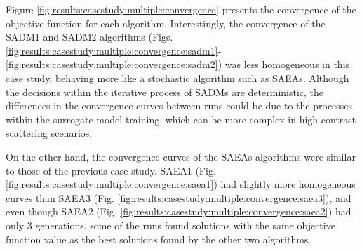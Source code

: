 			
			Figure \ref{fig:results:casestudy:multiple:convergence} presents the convergence of the objective function for each algorithm. Interestingly, the convergence of the SADM1 and SADM2 algorithms (Figs. \ref{fig:results:casestudy:multiple:convergence:sadm1}-\ref{fig:results:casestudy:multiple:convergence:sadm2}) was less homogeneous in this case study, behaving more like a stochastic algorithm such as SAEAs. Although the decisions within the iterative process of SADMs are deterministic, the differences in the convergence curves between runs could be due to the processes within the surrogate model training, which can be more complex in high-contrast scattering scenarios.
			
			On the other hand, the convergence curves of the SAEAs algorithms were similar to those of the previous case study. SAEA1 (Fig. \ref{fig:results:casestudy:multiple:convergence:saea1}) had slightly more homogeneous curves than SAEA3 (Fig. \ref{fig:results:casestudy:multiple:convergence:saea3}), and even though SAEA2 (Fig. \ref{fig:results:casestudy:multiple:convergence:saea2}) had only 3 generations, some of the runs found solutions with the same objective function value as the best solutions found by the other two algorithms.
			
